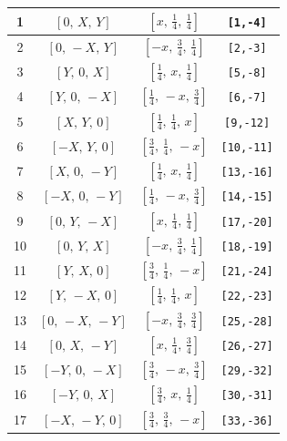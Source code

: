 \documentclass[fleqn,8pt]{jsarticle}
\begin{document}
\begin{longtable}{cccc}
1 & $\left[ 0,\, X,\, Y \right]$ & $\left[ x,\, \frac{1}{4},\, \frac{1}{4} \right]$ & {\tt [1,-4]} \\ \hline
2 & $\left[ 0,\, - X,\, Y \right]$ & $\left[ - x,\, \frac{3}{4},\, \frac{1}{4} \right]$ & {\tt [2,-3]} \\ \hline
3 & $\left[ Y,\, 0,\, X \right]$ & $\left[ \frac{1}{4},\, x,\, \frac{1}{4} \right]$ & {\tt [5,-8]} \\ \hline
4 & $\left[ Y,\, 0,\, - X \right]$ & $\left[ \frac{1}{4},\, - x,\, \frac{3}{4} \right]$ & {\tt [6,-7]} \\ \hline
5 & $\left[ X,\, Y,\, 0 \right]$ & $\left[ \frac{1}{4},\, \frac{1}{4},\, x \right]$ & {\tt [9,-12]} \\ \hline
6 & $\left[ - X,\, Y,\, 0 \right]$ & $\left[ \frac{3}{4},\, \frac{1}{4},\, - x \right]$ & {\tt [10,-11]} \\ \hline
7 & $\left[ X,\, 0,\, - Y \right]$ & $\left[ \frac{1}{4},\, x,\, \frac{1}{4} \right]$ & {\tt [13,-16]} \\ \hline
8 & $\left[ - X,\, 0,\, - Y \right]$ & $\left[ \frac{1}{4},\, - x,\, \frac{3}{4} \right]$ & {\tt [14,-15]} \\ \hline
9 & $\left[ 0,\, Y,\, - X \right]$ & $\left[ x,\, \frac{1}{4},\, \frac{1}{4} \right]$ & {\tt [17,-20]} \\ \hline
10 & $\left[ 0,\, Y,\, X \right]$ & $\left[ - x,\, \frac{3}{4},\, \frac{1}{4} \right]$ & {\tt [18,-19]} \\ \hline
11 & $\left[ Y,\, X,\, 0 \right]$ & $\left[ \frac{3}{4},\, \frac{1}{4},\, - x \right]$ & {\tt [21,-24]} \\ \hline
12 & $\left[ Y,\, - X,\, 0 \right]$ & $\left[ \frac{1}{4},\, \frac{1}{4},\, x \right]$ & {\tt [22,-23]} \\ \hline
13 & $\left[ 0,\, - X,\, - Y \right]$ & $\left[ - x,\, \frac{3}{4},\, \frac{3}{4} \right]$ & {\tt [25,-28]} \\ \hline
14 & $\left[ 0,\, X,\, - Y \right]$ & $\left[ x,\, \frac{1}{4},\, \frac{3}{4} \right]$ & {\tt [26,-27]} \\ \hline
15 & $\left[ - Y,\, 0,\, - X \right]$ & $\left[ \frac{3}{4},\, - x,\, \frac{3}{4} \right]$ & {\tt [29,-32]} \\ \hline
16 & $\left[ - Y,\, 0,\, X \right]$ & $\left[ \frac{3}{4},\, x,\, \frac{1}{4} \right]$ & {\tt [30,-31]} \\ \hline
17 & $\left[ - X,\, - Y,\, 0 \right]$ & $\left[ \frac{3}{4},\, \frac{3}{4},\, - x \right]$ & {\tt [33,-36]} \\ \hline

\end{longtable}
\end{document}
